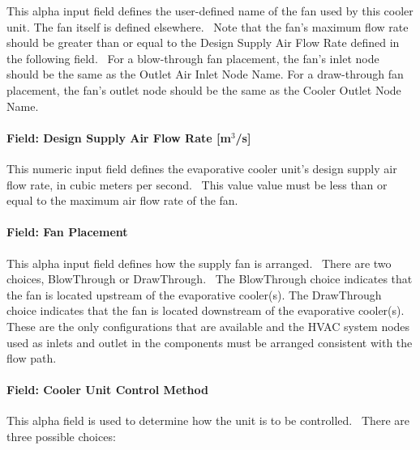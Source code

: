 This alpha input field defines the user-defined name of the fan used by this cooler unit. The fan itself is defined elsewhere.~ Note that the fan's maximum flow rate should be greater than or equal to the Design Supply Air Flow Rate defined in the following field.~ For a blow-through fan placement, the fan's inlet node should be the same as the Outlet Air Inlet Node Name. For a draw-through fan placement, the fan's outlet node should be the same as the Cooler Outlet Node Name.

\paragraph{Field: Design Supply Air Flow Rate {[}m\(^{3}\)/s{]}}\label{field-design-supply-air-flow-rate-m3s}

This numeric input field defines the evaporative cooler unit's design supply air flow rate, in cubic meters per second.~ This value value must be less than or equal to the maximum air flow rate of the fan.

\paragraph{Field: Fan Placement}\label{field-fan-placement-001}

This alpha input field defines how the supply fan is arranged.~ There are two choices, BlowThrough or DrawThrough.~ The BlowThrough choice indicates that the fan is located upstream of the evaporative cooler(s). The DrawThrough choice indicates that the fan is located downstream of the evaporative cooler(s). These are the only configurations that are available and the HVAC system nodes used as inlets and outlet in the components must be arranged consistent with the flow path.

\paragraph{Field: Cooler Unit Control Method}\label{field-cooler-unit-control-method}

This alpha field is used to determine how the unit is to be controlled.~ There are three possible choices:


